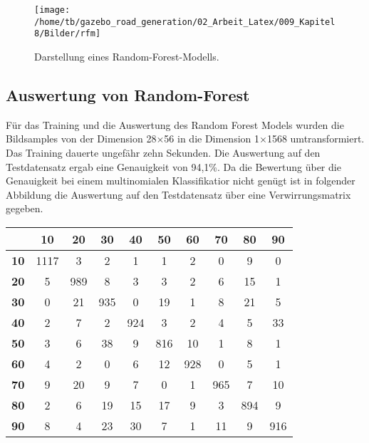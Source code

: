 {{{{{{{{\begin{figure}[H]
\begin{center}
  \texttt{[image: /home/tb/gazebo\_road\_generation/02\_Arbeit\_Latex/009\_Kapitel8/Bilder/rfm]}%
  \caption[Darstellung eines Random-Forest-Modells]%
           {\label{fig:Ein Random-Forest-Modells}%
           Darstellung eines Random-Forest-Modells.
           }
\end{center}
\end{figure}

\subsection{Auswertung von Random-Forest}
\label{subsec:Auswertung von Random-Forest}


F\"ur das Training und die Auswertung des Random Forest Models wurden die Bildsamples von der Dimension 28$\times$56 in die Dimension 1$\times$1568 umtransformiert.
Das Training dauerte ungef{\"a}hr zehn Sekunden.
Die Auswertung auf den Testdatensatz ergab eine Genauigkeit von 94,1\%.
Da die Bewertung \"uber die Genauigkeit bei einem multinomialen Klassifikatior nicht gen\"ugt ist in folgender Abbildung die Auswertung auf den Testdatensatz \"uber eine Verwirrungsmatrix gegeben.

\begin{center}


\begin{tabular}{|c|c|c|c|c|c|c|c|c|c|}
\hline
    & \textbf{10} & \textbf{20} & \textbf{30} & \textbf{40} & \textbf{50} & \textbf{60} & \textbf{70} & \textbf{80} & \textbf{90} \\
\hline
\textbf{10} & 1117 &  3 &  2 &  1 &  1 &  2 &  0 &  9 &  0 \\
\hline
\textbf{20} &  5  & 989 &   8 &   3 &   3 &   2 &   6 &  15 &   1 \\
\hline
\textbf{30} & 0  & 21 & 935  &  0 &  19 &   1 &   8 &  21 &   5 \\
\hline 
\textbf{40} &  2 &   7 &   2 & 924  &  3  &  2 &   4  &  5 &  33 \\
\hline 
\textbf{50} &  3 &   6 &  38 &   9 & 816 &  10 &   1 &   8 &   1 \\
\hline 
\textbf{60} &  4  &  2 &   0 &   6 &  12 & 928 &   0  &  5 &   1 \\
\hline 
\textbf{70} &  9  & 20 &   9 &   7 &   0  &  1 & 965  &  7 &  10 \\
\hline 
\textbf{80} &  2  &  6 &  19 &  15 &  17 &   9  &  3 & 894  &  9 \\
\hline
\textbf{90} &  8  &  4 &  23 &  30 &   7 &   1 &  11 &   9 & 916 \\
\hline
\end{tabular}


\end{center}}}}}}}}}
